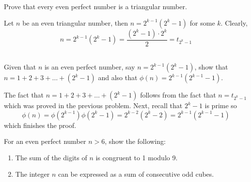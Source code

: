 \begin{exercise}
    Prove that every even perfect number is a triangular number. \\
\end{exercise}

\begin{solution}
    Let $n$ be an even triangular number, then $n = 2^{k-1}(2^k - 1)$ for some $k$. Clearly,
    $$n = 2^{k-1}(2^k - 1) = \frac{(2^k - 1)\cdot 2^k}{2} = t_{2^k - 1}$$\\
\end{solution}

\begin{exercise}
    Given that $n$ is an even perfect number, say $n = 2^{k-1}(2^k - 1)$, show that $n = 1 + 2 + 3 + \dots + (2^k - 1)$ and also that $\phi(n) = 2^{k-1}(2^{k-1} - 1)$. \\
\end{exercise}

\begin{solution}
    The fact that $n = 1 + 2 + 3 + \dots + (2^k - 1)$ follows from the fact that $n = t_{2^k - 1}$ which was proved in the previous problem. Next, recall that $2^k - 1$ is prime so
    $$\phi(n) = \phi(2^{k-1})\phi(2^k - 1) = 2^{k-2}(2^k - 2) = 2^{k-1}(2^{k-1} - 1)$$
    which finishes the proof. \\
\end{solution}

\begin{exercise}
    For an even perfect number $n > 6$, show the following:
    \begin{enumerate}
        \item The sum of the digits of $n$ is congruent to 1 modulo 9. 
        \item The integer $n$ can be expressed as a sum of consecutive odd cubes.  \\
    \end{enumerate}
\end{exercise}

